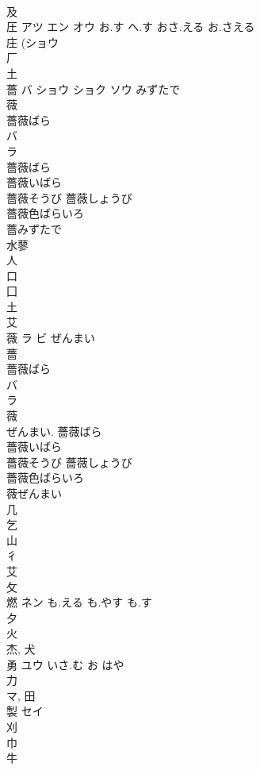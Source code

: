 \documentclass[8pt]{extreport}
\begin{document}
\begin{CJK}{UTF8}{min}
\\	及 
\\	圧	アツ エン オウ	お.す へ.す おさ.える お.さえる	
\\	庄 (ショウ 
\\	厂 
\\	土 
\\	薔	バ ショウ ショク ソウ	みずたで	
\\	薇 
\\	薔薇ばら 
\\	バ 
\\	ラ 
\\	薔薇ばら 
\\	薔薇いばら 
\\	薔薇そうび 薔薇しょうび 
\\	薔薇色ばらいろ 
\\	薔みずたで 
\\	水蓼 
\\	人 
\\	口 
\\	囗 
\\	土 
\\	艾 
\\	薇	ラ ビ	ぜんまい	
\\	薔 
\\	薔薇ばら 
\\	バ 
\\	ラ 
\\	薇 
\\	ぜんまい.	薔薇ばら 
\\	薔薇いばら 
\\	薔薇そうび 薔薇しょうび 
\\	薔薇色ばらいろ 
\\	薇ぜんまい 
\\	几 
\\	乞 
\\	山 
\\	彳 
\\	艾 
\\	攵 
\\	燃	ネン	も.える も.やす も.す	
\\	夕 
\\	火 
\\	杰, 犬 
\\	勇	ユウ	いさ.む お はや	
\\	力 
\\	マ, 田 
\\	製	セイ		
\\	刈 
\\	巾 
\\	牛 

\end{CJK}
\end{document}
